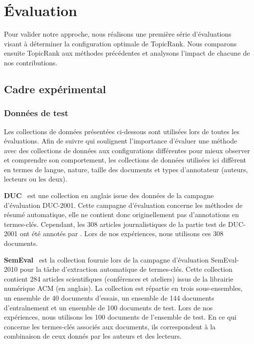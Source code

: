 \section{Évaluation}
\label{sec:evaluation}
  Pour valider notre approche, nous réalisons une première série d'évaluations
  visant à déterminer la configuration optimale de TopicRank. Nous comparons 
  ensuite TopicRank aux méthodes précédentes et analysons l'impact de chacune de
  nos contributions.

  \subsection{Cadre expérimental}
  \label{subsec:cadre_experimental}
    \subsubsection{Données de test}
    \label{subsubsec:donnees_de_test}
      Les collections de données présentées ci-dessous sont utilisées lors de
      toutes les évaluations. Afin de suivre  qui
      soulignent l'importance d'évaluer une méthode avec des collections de
      données aux configurations différentes pour mieux observer et comprendre
      son comportement, les collections de données utilisées ici diffèrent en
      termes de langue, nature, taille des documents et types d'annotateur
      (auteurs, lecteurs ou les deux).

      \textbf{DUC}~\cite{over2001duc} est une collection en anglais issue des
      données de la campagne d'évaluation DUC-2001. Cette campagne d'évaluation
      concerne les méthodes de résumé automatique, elle ne contient donc
      originellement pas d'annotations en termes-clés. Cependant, les 308
      articles journalistiques de la partie test de DUC-2001 ont été annotés par
      . Lors de nos expériences, nous utilisons ces
      308 documents.

      \textbf{SemEval}~\cite{kim2010semeval} est la collection fournie lors de
      la campagne d'évaluation SemEval-2010 pour la tâche d'extraction
      automatique de termes-clés. Cette collection contient 284 articles
      scientifiques (conférences et ateliers) issus de la librairie numérique
      ACM (en anglais). La collection est répartie en trois sous-ensembles, un
      ensemble de 40 documents d'essais, un ensemble de 144 documents
      d'entraînement et un ensemble de 100 documents de test. Lors de nos
      expériences, nous utilisons les 100 documents de l'ensemble de test. En ce
      qui concerne les termes-clés associés aux documents, ils correspondent à
      la combinaison de ceux donnés par les auteurs et des lecteurs.

